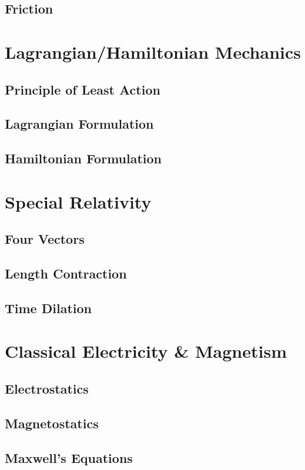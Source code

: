 \documentclass[oneside]{book}
\numberwithin{figure}{section}
\numberwithin{equation}{section}
\theoremstyle{definition}
\begin{document}
	\section{Friction}

	\chapter{Lagrangian/Hamiltonian Mechanics}
	\section{Principle of Least Action}
	\section{Lagrangian Formulation}
	\section{Hamiltonian Formulation}

	\chapter{Special Relativity}
	\section{Four Vectors}
	\section{Length Contraction}
	\section{Time Dilation}

	\chapter{Classical Electricity \& Magnetism}
	\section{Electrostatics}
	\section{Magnetostatics}
	\section{Maxwell's Equations}
\end{document}
